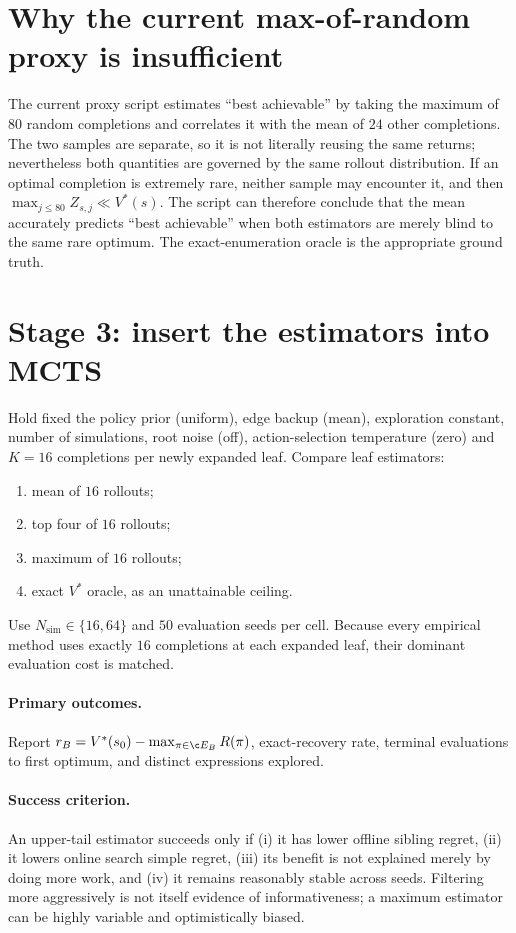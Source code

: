\section{Why the current max-of-random proxy is insufficient}

The current proxy script estimates ``best achievable'' by taking the maximum of
$80$ random completions and correlates it with the mean of $24$ other
completions. The two samples are separate, so it is not literally reusing the
same returns; nevertheless both quantities are governed by the same rollout
distribution. If an optimal completion is extremely rare, neither sample may
encounter it, and then $\max_{j\le 80}Z_{s,j}\ll V^*(s)$. The script can
therefore conclude that the mean accurately predicts ``best achievable'' when
both estimators are merely blind to the same rare optimum. The exact-enumeration
oracle is the appropriate ground truth.

\section{Stage 3: insert the estimators into MCTS}

Hold fixed the policy prior (uniform), edge backup (mean), exploration constant,
number of simulations, root noise (off), action-selection temperature (zero) and
$K=16$ completions per newly expanded leaf. Compare leaf estimators:
\begin{enumerate}[nosep]
  \item mean of $16$ rollouts;
  \item top four of $16$ rollouts;
  \item maximum of $16$ rollouts;
  \item exact $V^*$ oracle, as an unattainable ceiling.
\end{enumerate}
Use $N_{\mathrm{sim}}\in\{16,64\}$ and $50$ evaluation seeds per cell. Because
every empirical method uses exactly $16$ completions at each expanded leaf, their
dominant evaluation cost is matched.

\paragraph{Primary outcomes.} Report
$r_B=V^*(s_0)-\max_{\pi\in\c E_B}R(\pi)$, exact-recovery rate, terminal
evaluations to first optimum, and distinct expressions explored.

\paragraph{Success criterion.} An upper-tail estimator succeeds only if (i) it has
lower offline sibling regret, (ii) it lowers online search simple regret,
(iii) its benefit is not explained merely by doing more work, and (iv) it remains
reasonably stable across seeds. Filtering more aggressively is not itself evidence
of informativeness; a maximum estimator can be highly variable and optimistically
biased.

